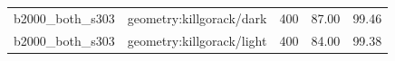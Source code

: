 \begin{longtable}{l>{\raggedright\arraybackslash}p{.42\linewidth}rrr}
b2000\_\allowbreak{}both\_\allowbreak{}s303 & %
geometry:killgorack/dark & %
400 & %
87.00 & %
99.46 \\ %

b2000\_\allowbreak{}both\_\allowbreak{}s303 & %
geometry:killgorack/light & %
400 & %
84.00 & %
99.38 \\ %


\end{longtable}
